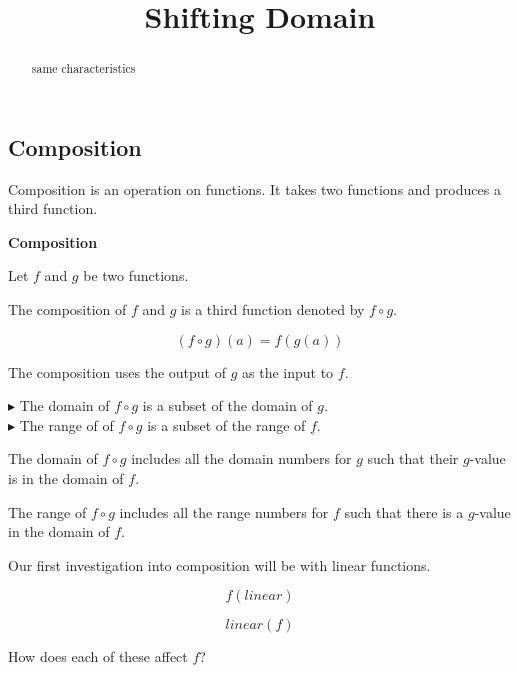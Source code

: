 \documentclass{ximera}
\title{Shifting Domain}
\begin{document}
\begin{abstract}
same characteristics
\end{abstract}
\maketitle










\subsection*{Composition}


Composition is an operation on functions.  It takes two functions and produces a third function.


\begin{idea}  \textbf{\textcolor{blue!55!black}{Composition}}


Let $f$ and $g$ be two functions.

The composition of $f$ and $g$ is a third function denoted by $f \circ g$.

\[
(f \circ g)(a) = f(g(a))
\]


\end{idea}


The composition uses the output of $g$ as the input to $f$.

$\blacktriangleright$ The domain of $f \circ g$ is a subset of the domain of $g$.\\
$\blacktriangleright$ The range of of $f \circ g$ is a subset of the range of $f$.


The domain of $f \circ g$ includes all the domain numbers for $g$ such that their $g$-value is in the domain of $f$.

The range of $f \circ g$ includes all the range numbers for $f$ such that there is a $g$-value in the domain of $f$.


Our first investigation into composition will be with linear functions.


\[
f(linear)
\]


\[
linear(f)
\]

How does each of these affect $f$?
\end{document}
